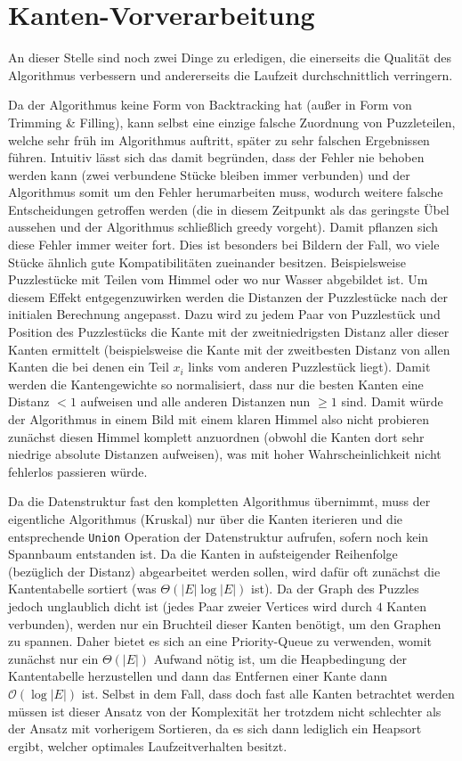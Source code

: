 \documentclass{whswinvcbook}
\begin{document}
\section{Kanten-Vorverarbeitung}
An dieser Stelle sind noch zwei Dinge zu erledigen, die einerseits die Qualität des Algorithmus verbessern und andererseits die Laufzeit durchschnittlich verringern.

Da der Algorithmus keine Form von Backtracking hat (außer in Form von Trimming \& Filling), kann selbst eine einzige falsche Zuordnung von Puzzleteilen, welche sehr früh im Algorithmus auftritt, später zu sehr falschen Ergebnissen führen. Intuitiv lässt sich das damit begründen, dass der Fehler nie behoben werden kann (zwei verbundene Stücke bleiben immer verbunden) und der Algorithmus somit um den Fehler herumarbeiten muss, wodurch weitere falsche Entscheidungen getroffen werden (die in diesem Zeitpunkt als das geringste Übel aussehen und der Algorithmus schließlich greedy vorgeht). Damit pflanzen sich diese Fehler immer weiter fort. Dies ist besonders bei Bildern der Fall, wo viele Stücke ähnlich gute Kompatibilitäten zueinander besitzen. Beispielsweise Puzzlestücke mit Teilen vom Himmel oder wo nur Wasser abgebildet ist. Um diesem Effekt entgegenzuwirken werden die Distanzen der Puzzlestücke nach der initialen Berechnung angepasst. Dazu wird zu jedem Paar von Puzzlestück und Position des Puzzlestücks die Kante mit der zweitniedrigsten Distanz aller dieser Kanten ermittelt (beispielsweise die Kante mit der zweitbesten Distanz von allen Kanten die bei denen ein Teil $x_i$ links vom anderen Puzzlestück liegt).\cite{gallagher,crisjim} Damit werden die Kantengewichte so normalisiert, dass nur die besten Kanten eine Distanz $<1$ aufweisen und alle anderen Distanzen nun $\geq1$ sind. Damit würde der Algorithmus in einem Bild mit einem klaren Himmel also nicht probieren zunächst diesen Himmel komplett anzuordnen (obwohl die Kanten dort sehr niedrige absolute Distanzen aufweisen), was mit hoher Wahrscheinlichkeit nicht fehlerlos passieren würde.

Da die Datenstruktur fast den kompletten Algorithmus übernimmt, muss der eigentliche Algorithmus (Kruskal) nur über die Kanten iterieren und die entsprechende \texttt{Union} Operation der Datenstruktur aufrufen, sofern noch kein Spannbaum entstanden ist. Da die Kanten in aufsteigender Reihenfolge (bezüglich der Distanz) abgearbeitet werden sollen, wird dafür oft zunächst die Kantentabelle sortiert (was $\Theta(|E|\log|E|)$ ist). Da der Graph des Puzzles jedoch unglaublich dicht ist (jedes Paar zweier Vertices wird durch $4$ Kanten verbunden), werden nur ein Bruchteil dieser Kanten benötigt, um den Graphen zu spannen. Daher bietet es sich an eine Priority-Queue zu verwenden, womit zunächst nur ein $\Theta(|E|)$ Aufwand nötig ist, um die Heapbedingung der Kantentabelle herzustellen und dann das Entfernen einer Kante dann $\mathcal{O}(\log|E|)$ ist. Selbst in dem Fall, dass doch fast alle Kanten betrachtet werden müssen ist dieser Ansatz von der Komplexität her trotzdem nicht schlechter als der Ansatz mit vorherigem Sortieren, da es sich dann lediglich ein Heapsort ergibt, welcher optimales Laufzeitverhalten besitzt.
\end{document}
